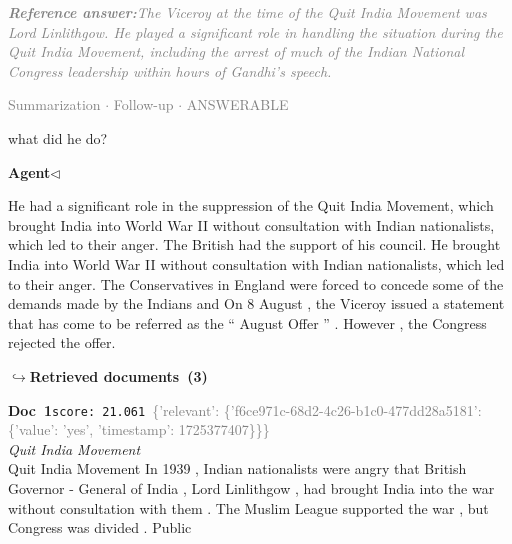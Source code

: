\documentclass[a4paper,11pt]{article}
\begin{document}
\begin{refanswerenv}
{\footnotesize\textit{\textcolor{gray}{\textbf{Reference answer:}\enspace The Viceroy at the time of the Quit India Movement was Lord Linlithgow. He played a significant role in handling the situation during the Quit India Movement, including the arrest of much of the Indian National Congress leadership within hours of Gandhi's speech.}}}
\end{refanswerenv}
\vspace{0.5em}
\hfill{\tiny\textcolor{gray}{Summarization $\cdot$ Follow-up $\cdot$ ANSWERABLE}}
\begin{userbubble}
what did he do?
\end{userbubble}
\noindent\hfill{\small\textcolor{agentcolor}{\textbf{Agent\enspace$\triangleleft$}}}
\begin{agentbubble}
He had a significant role in the suppression of the Quit India Movement, which brought India into World War II without consultation with Indian nationalists, which led to their anger. The British had the support of his council. He brought India into World War II without consultation with Indian nationalists, which led to their anger.  The Conservatives in England were forced to concede some of the demands made by the Indians and On 8 August , the Viceroy issued a statement that has come to be referred as the `` August Offer '' . However , the Congress rejected the offer.
\end{agentbubble}
\noindent\hfill{\footnotesize\textcolor{doccolor}{\textbf{$\hookrightarrow$\enspace Retrieved documents~(3)}}}
\begin{docenv}
{\footnotesize\textcolor{doccolor}{\textbf{Doc~1}}}\hfill{\tiny\texttt{score:~21.061}}\ {\tiny\textcolor{gray}{\{'relevant': \{'f6ce971c-68d2-4c26-b1c0-477dd28a5181': \{'value': 'yes', 'timestamp': 1725377407\}\}\}}}\\[3pt]
{\small\textit{Quit India Movement}}\\[2pt]
\vspace{2pt}
{\footnotesize Quit India Movement
In 1939 , Indian nationalists were angry that British Governor - General of India , Lord Linlithgow , had brought India into the war without consultation with them . The Muslim League supported the war , but Congress was divided . Public}
\end{docenv}
\end{document}
